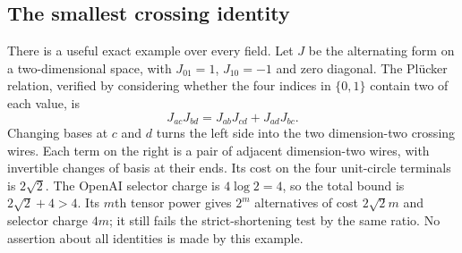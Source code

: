 \subsection{The smallest crossing identity}
There is a useful exact example over every field. Let $J$ be the alternating form on a two-dimensional space, with $J_{01}=1$, $J_{10}=-1$ and zero diagonal. The Pl\"ucker relation, verified by considering whether the four indices in $\{0,1\}$ contain two of each value, is
\[
 J_{ac}J_{bd}=J_{ab}J_{cd}+J_{ad}J_{bc}.
\]
Changing bases at $c$ and $d$ turns the left side into the two dimension-two crossing wires. Each term on the right is a pair of adjacent dimension-two wires, with invertible changes of basis at their ends. Its cost on the four unit-circle terminals is $2\sqrt2$. The OpenAI selector charge is $4\log2=4$, so the total bound is $2\sqrt2+4>4$. Its $m$th tensor power gives $2^m$ alternatives of cost $2\sqrt2m$ and selector charge $4m$; it still fails the strict-shortening test by the same ratio. No assertion about all identities is made by this example.

